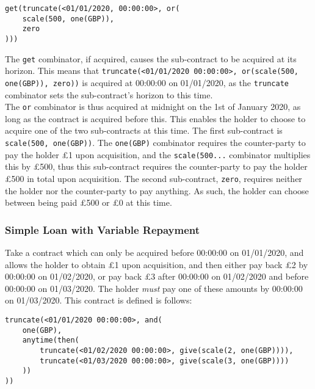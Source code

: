 \begin{Verbatim}[frame=single, samepage=true, rulecolor=\textcolor{black!50}]
get(truncate(<01/01/2020, 00:00:00>, or(
    scale(500, one(GBP)),
    zero
)))
\end{Verbatim}

The \texttt{get} combinator, if acquired, causes the sub-contract to be acquired at its horizon. This means that \texttt{truncate(<01/01/2020 00:00:00>, or(scale(500, one(GBP)), zero))} is acquired at 00\-:00:00 on 01/01/2020, as the \texttt{truncate} combinator sets the sub-contract's horizon to this time. \\

The \texttt{or} combinator is thus acquired at midnight on the 1st of January 2020, as long as the contract is acquired before this. This enables the holder to choose to acquire one of the two sub-contracts at this time. The first sub-contract is \texttt{scale(500, one(GBP))}. The \texttt{one(GBP)} combinator requires the counter-party to pay the holder £1 upon acquisition, and the \texttt{scale(500...} combinator multiplies this by £500, thus this sub-contract requires the counter-party to pay the holder £500 in total upon acquisition. The second sub-contract, \texttt{zero}, requires neither the holder nor the counter-party to pay anything. As such, the holder can choose between being paid £500 or £0 at this time.


\subsubsection{Simple Loan with Variable Repayment}

Take a contract which can only be acquired before 00:00:00 on 01/01/2020, and allows the holder to obtain £1 upon acquisition, and then either pay back £2 by 00:00:00 on 01/02/2020, or pay back £3 after 00:00:00 on 01/02/2020 and before 00:00:00 on 01/03/2020. The holder \textit{must} pay one of these amounts by 00:00:00 on 01/03/2020. This contract is defined is follows:

\begin{Verbatim}[frame=single, samepage=true, rulecolor=\textcolor{black!50}]
truncate(<01/01/2020 00:00:00>, and(
    one(GBP),
    anytime(then(
        truncate(<01/02/2020 00:00:00>, give(scale(2, one(GBP)))),
        truncate(<01/03/2020 00:00:00>, give(scale(3, one(GBP))))
    ))
))
\end{Verbatim}


